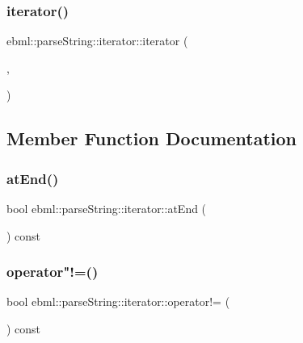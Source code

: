 \subsubsection{\texorpdfstring{iterator()}{iterator()}}
{\footnotesize\ttfamily ebml\+::parse\+String\+::iterator\+::iterator (\begin{DoxyParamCaption}\item[{const char $\ast$}]{,  }\item[{size\+\_\+t}]{ }\end{DoxyParamCaption})}



\subsection{Member Function Documentation}
\mbox{\label{classebml_1_1parseString_1_1iterator_a9f929d744bd65be4508ac9403ed1f998}} 
\subsubsection{\texorpdfstring{at\+End()}{atEnd()}}
{\footnotesize\ttfamily bool ebml\+::parse\+String\+::iterator\+::at\+End (\begin{DoxyParamCaption}{ }\end{DoxyParamCaption}) const}

\mbox{\label{classebml_1_1parseString_1_1iterator_a2f93ead5c4fd4b6a84a269ba49432c4c}} 
\subsubsection{\texorpdfstring{operator"!=()}{operator!=()}}
{\footnotesize\ttfamily bool ebml\+::parse\+String\+::iterator\+::operator!= (\begin{DoxyParamCaption}\item[{const \mbox{\hyperlink{classebml_1_1parseString_1_1iterator}{parse\+String\+::iterator}} \&}]{ }\end{DoxyParamCaption}) const}

